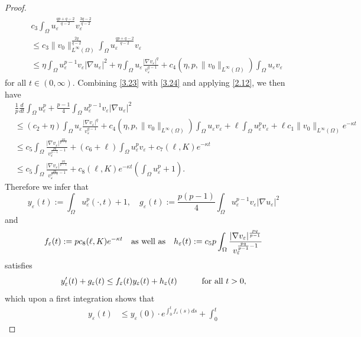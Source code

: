 \documentclass[12pt]{article}
\theoremstyle{plain}
\theoremstyle{definition}
\numberwithin{equation}{section}
\begin{document}
\begin{proof}
\begin{align}
\begin{split}
&c_3\int_{\Omega}u_{\varepsilon}^{\frac{qp+q-2}{q-2}}v_{\varepsilon}^{\frac{3q-2}{q-2}}\\
   &\leq c_3\|v_0\|_{L^\infty(\Omega)}^{\frac{2q}{q-2}}\int_{\Omega}u_{\varepsilon}^{\frac{qp+q-2}{q-2}}v_{\varepsilon}
   \\
   &\leq\eta\int_{\Omega}u_{\varepsilon}^{p-1}v_{\varepsilon}|\nabla u_{\varepsilon}|^2+\eta\int_{\Omega}u_{\varepsilon}\frac{|\nabla
   v_{\varepsilon}|^q}{v_{\varepsilon}^{q-1}}+c_4(\eta,p,\|v_0\|_{L^\infty(\Omega)})\int_{\Omega}u_{\varepsilon}v_{\varepsilon}
\end{split}
\end{align}
for all $t\in (0,\infty)$.
Combining  \eqref{3.23} with \eqref{3.24} and applying \eqref{2.12}, we then have
    \begin{align}
             &\frac{1}{p}\frac{d}{dt}\int_\Omega u_\varepsilon^p+\frac{p-1}{4}\int_\Omega u_\varepsilon^{p-1}v_\varepsilon|\nabla u_\varepsilon|^2\nonumber\\
             &\leq (c_2+\eta) \int_{\Omega}u_{\varepsilon}\frac{|\nabla v_{\varepsilon}|^q}{v_{\varepsilon}^{q-1}}
             +c_4(\eta,p,\|v_0\|_{L^\infty(\Omega)})\int_{\Omega}u_{\varepsilon}v_{\varepsilon}+\ell\int_\Omega u_\varepsilon^p v_\varepsilon+\ell c_1\|v_0\|_{L^\infty(\Omega)}e^{-\kappa t}\nonumber\\
             &\leq c_5\int_\Omega\frac{|\nabla v_\varepsilon|^{\frac{pq}{p-1}}}{v_\varepsilon^{\frac{pq}{p-1}-1}}+(c_6+\ell)\int_\Omega u_\varepsilon^p v_\varepsilon+c_7(\ell,K)e^{-\kappa t}\\
             &\leq c_5\int_\Omega\frac{|\nabla v_\varepsilon|^{\frac{pq}{p-1}}}{v_\varepsilon^{\frac{pq}{p-1}-1}}+c_8(\ell,K)
             e^{-\kappa t}(\int_\Omega u_\varepsilon^p +1).\nonumber
    \end{align}
Therefore we infer that
$$y_{\varepsilon}(t):=\int_\Omega u_\varepsilon^p(\cdot,t)+1, \quad g_{\varepsilon}(t) :=\frac{p(p-1)}{4}\int_\Omega u_\varepsilon^{p-1}v_\varepsilon|\nabla u_\varepsilon|^2$$
 and $$ f_{\varepsilon}(t):= pc_8(\ell,K)e^{-\kappa t}\quad\hbox{as well as}\quad h_{\varepsilon}(t):=
 c_5p\int_\Omega\frac{|\nabla v_\varepsilon|^{\frac{pq}{p-1}}}{v_\varepsilon^{\frac{pq}{p-1}-1}}
$$ satisfies
$$  y'_{\varepsilon}(t)+ g_{\varepsilon}(t) \leq f_{\varepsilon}(t)y_{\varepsilon}(t) +h_{\varepsilon}(t) \quad\quad\quad \hbox{for all}\,\, t>0,
$$
which  upon a first integration shows that
\begin{equation}
\begin{split}y_{\varepsilon}(t)& \leq  y_{\varepsilon}(0)\cdot e^{\int^t_0 f_{\varepsilon}(s)ds}+\int^t_0

\end{split}
\end{equation}
\end{proof}
\end{document}
